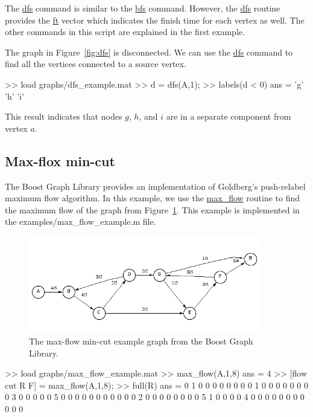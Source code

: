 \documentclass[12pt]{article}
\newcommand{\mycmd}[1]{\url{#1}}
\newcommand{\mypath}[1]{{\ttfamily \small #1}}
\begin{document}
The \mycmd{dfs} command is similar to the \mycmd{bfs} command.  However, the \mycmd{dfs} routine provides the \mycmd{ft} vector which indicates the finish time for each vertex as well.  The other commands in this script are explained in the first example. 

The graph in Figure~\ref{fig:dfs} is disconnected.  We can use the \mycmd{dfs} command to find all the vertices connected to a source vertex.  

\begin{mcode}
>> load graphs/dfs_example.mat
>> d = dfs(A,1);
>> labels(d < 0)
ans = 
    'g'
    'h'
    'i'
\end{mcode}

This result indicates that nodes $g$, $h$, and $i$ are in a separate component from vertex $a$.  

\subsection{Max-flox min-cut}
The Boost Graph Library provides an implementation of Goldberg's push-relabel maximum flow algorithm.  In this example, we use the \mycmd{max_flow} routine to find the maximum flow of the graph from Figure~\ref{fig:mincut}.  This example is implemented in the \mypath{examples/max\_flow\_example.m} file.  

\begin{figure}[ht!]
\centering
\includegraphics[width=4in]{max-flow}
\caption{The max-flow min-cut example graph from the Boost Graph Library.}
\label{fig:mincut}
\end{figure}

\begin{mcode}
>> load graphs/max_flow_example.mat
>> max_flow(A,1,8)
ans =
     4
>> [flow cut R F] = max_flow(A,1,8);
>> full(R)     
ans =
     0     1     0     0     0     0     0     0
     0     0     1     0     0     0     0     0
     0     0     0     3     0     0     0     0
     0     5     0     0     0     0     0     0
     0     0     0     0     0     2     0     0
     0     0     0     0     0     0     5     1
     0     0     0     0     4     0     0     0
     0     0     0     0     0     0     0     0
\end{mcode}
\end{document}
